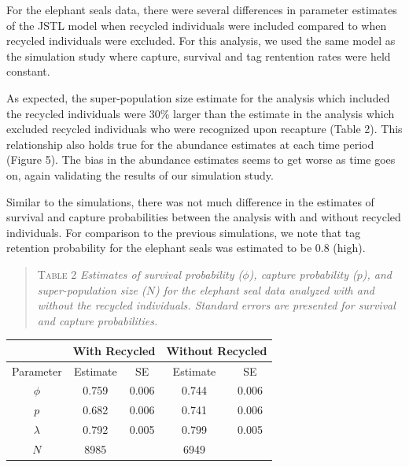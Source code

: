 \documentclass[]{article}
\begin{document}
For the elephant seals data, there were several differences in parameter
estimates of the JSTL model when recycled individuals were included
compared to when recycled individuals were excluded. For this analysis, we used the same model as the simulation study where capture, survival and tag rentention rates were held constant.  

As expected, the
super-population size estimate for the analysis which included the
recycled individuals were 30\% larger than the estimate in the analysis
which excluded recycled individuals who were recognized upon recapture
(Table 2). This relationship also holds true for the abundance estimates
at each time period (Figure 5). The bias in the abundance estimates
seems to get worse as time goes on, again validating the results of our
simulation study.

Similar to the simulations, there was not much difference in the
estimates of survival and capture probabilities between the analysis
with and without recycled individuals. For comparison to the previous
simulations, we note that tag retention probability for the
elephant seals was estimated to be 0.8 (high).

\begin{quote}
\textsc{Table 2}
\textsl{Estimates of survival probability ($\phi$), capture probability ($p$), and super-population size ($N$) for the elephant seal data analyzed with and without the recycled individuals. Standard errors are presented for survival and capture probabilities.}
\end{quote}

\begin{center}
\begin{tabular}{c c c c c}
& \multicolumn{2}{l}{With Recycled} & \multicolumn{2}{l}{Without Recycled} \\ \hline
Parameter & Estimate & SE & Estimate & SE \\ \hline
$\phi$ & 0.759 & 0.006 & 0.744 & 0.006\\
$p$ & 0.682 & 0.006 & 0.741 & 0.006 \\
$\lambda $ & 0.792 & 0.005 & 0.799 & 0.005\\
$N$ & 8985 & & 6949& \\ \hline
\end{tabular}
\end{center}
\end{document}
